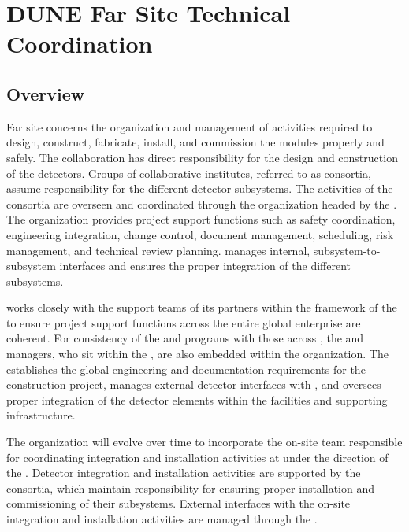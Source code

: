 \chapter{DUNE Far Site Technical Coordination}
\label{ch:exec-tc}

\section{Overview}

Far site  concerns the organization and management of 
activities required to design, construct,
fabricate, install, and commission the   modules properly and safely. 
      The  collaboration has direct responsibility for the design 
and construction of the  detectors.  Groups of collaborative 
institutes, referred to as consortia, assume responsibility for 
the different detector subsystems.  The activities of the consortia are 
overseen and coordinated through the   organization 
headed by the  .  The  organization 
provides project support functions such as safety coordination, 
engineering integration, change control, document management, scheduling, 
risk management, and technical review planning.    
manages internal, subsystem-to-subsystem interfaces and ensures the proper integration of the different subsystems.   

  works closely with the support teams of its 
 partners within the framework of the  to 
ensure project support functions across the entire global 
enterprise are coherent.  For consistency of the   
and  programs with those across , the 
  and  managers, who sit within 
the , are also embedded within the   
organization.  The  establishes the global engineering
and documentation requirements for the  
 construction project, manages external  detector 
interfaces with , and oversees proper 
integration of the  detector elements within the facilities 
and supporting infrastructure.  

The  organization will evolve over time to incorporate the 
on-site team responsible for coordinating integration and installation 
activities at  under the direction of the .  
Detector integration and installation activities are supported by the 
 consortia, which maintain responsibility for ensuring 
proper installation and commissioning of their subsystems.  External 
 interfaces with the on-site integration and installation 
activities are managed through the .

